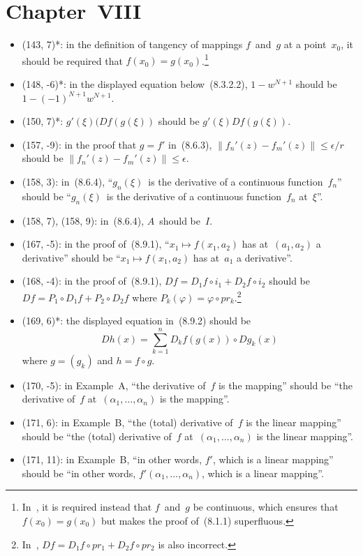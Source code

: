 \documentclass[letterpaper,12pt]{article}
\newcommand{\after}{\circ}
\newcommand{\norm}[1]{\lVert{#1}\rVert}
\begin{document}
\section*{Chapter~VIII}
\begin{itemize}
\item (143, 7)*: in the definition of tangency of mappings \(f\)~and~\(g\) at a point~\(x_0\), it should be required that \(f(x_0)=g(x_0)\).\footnote{In~\cite{dieudonne9th}, it is required instead that \(f\)~and~\(g\) be continuous, which ensures that \(f(x_0)=g(x_0)\) but makes the proof of~(8.1.1) superfluous.}
\item (148, -6)*: in the displayed equation below~(8.3.2.2), \(1-w^{N+1}\) should be \(1-(-1)^{N+1}w^{N+1}\).
\item (150, 7)*: \(g'(\xi)(Df(g(\xi))\) should be \(g'(\xi)Df(g(\xi))\).
\item (157, -9): in the proof that \(g=f'\) in~(8.6.3), \(\norm{f_n'(z)-f_m'(z)}\le\epsilon/r\) should be \(\norm{f_n'(z)-f_m'(z)}\le\epsilon\).
\item (158, 3): in~(8.6.4), ``\(g_n(\xi)\)~is the derivative of a continuous function~\(f_n\)'' should be ``\(g_n(\xi)\)~is the derivative of a continuous function~\(f_n\) at~\(\xi\)''.
\item (158, 7), (158, 9): in~(8.6.4), \(A\)~should be~\(I\).
\item (167, -5): in the proof of~(8.9.1), ``\(x_1\mapsto f(x_1,a_2)\) has at~\((a_1,a_2)\) a derivative'' should be ``\(x_1\mapsto f(x_1,a_2)\) has at~\(a_1\) a derivative''.
\item (168, -4): in the proof of~(8.9.1), \(Df=D_1f\after i_1+D_2f\after i_2\) should be \(Df=P_1\after D_1f+P_2\after D_2f\) where \(P_k(\varphi)=\varphi\after pr_k\).\footnote{In~\cite{dieudonne9th}, \(Df=D_1f\after pr_1+D_2f\after pr_2\) is also incorrect.}
\item (169, 6)*: the displayed equation in~(8.9.2) should be
\[Dh(x)=\sum_{k=1}^nD_kf(g(x))\after Dg_k(x)\]
where \(g=(g_k)\) and \(h=f\after g\).
\item (170, -5): in Example~A, ``the derivative of~\(f\) is the mapping'' should be ``the derivative of~\(f\) at~\((\alpha_1,\ldots,\alpha_n)\) is the mapping''.
\item (171, 6): in Example~B, ``the (total) derivative of~\(f\) is the linear mapping'' should be ``the (total) derivative of~\(f\) at~\((\alpha_1,\ldots,\alpha_n)\) is the linear mapping''.
\item (171, 11): in Example~B, ``in other words, \(f'\), which is a linear mapping'' should be ``in other words, \(f'(\alpha_1,\ldots,\alpha_n)\), which is a linear mapping''.

\end{itemize}
\end{document}
